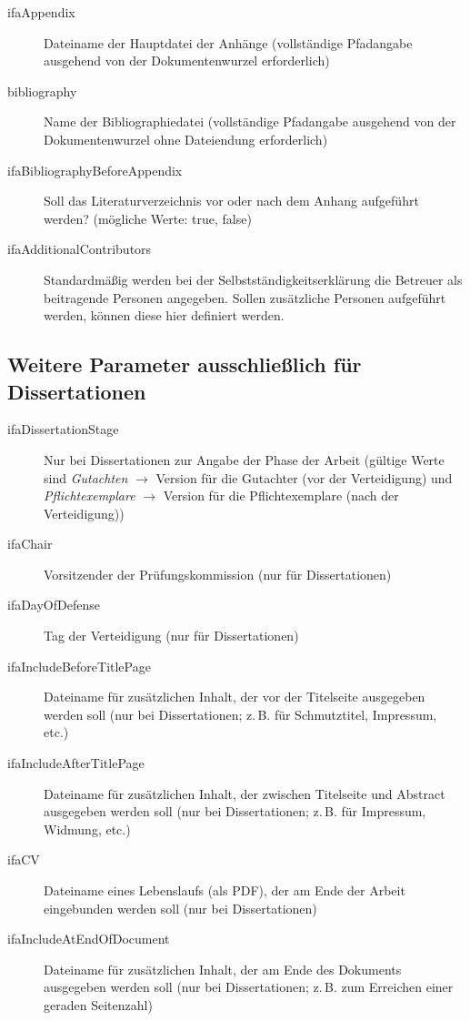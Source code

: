 \begin{description}
  \item[ifaAppendix] Dateiname der Hauptdatei der Anhänge (vollständige Pfadangabe ausgehend von der Dokumentenwurzel erforderlich)
  \item[bibliography] Name der Bibliographiedatei (vollständige Pfadangabe
  ausgehend von der Dokumentenwurzel ohne Dateiendung erforderlich)
  \item[ifaBibliographyBeforeAppendix] Soll das Literaturverzeichnis vor oder nach dem Anhang aufgeführt werden? (mögliche Werte: true, false)
  \item[ifaAdditionalContributors] Standardmäßig werden bei der
  Selbstständigkeitserklärung die Betreuer als beitragende Personen angegeben.
  Sollen zusätzliche Personen aufgeführt werden, können diese hier definiert werden.
\end{description}


\subsection{Weitere Parameter ausschließlich für Dissertationen}

\begin{description}
  \item[ifaDissertationStage] Nur bei Dissertationen zur Angabe der Phase der Arbeit (gültige Werte sind \emph{Gutachten} $\rightarrow$ Version für die Gutachter (vor der Verteidigung) und \emph{Pflichtexemplare} $\rightarrow$ Version für die Pflichtexemplare (nach der Verteidigung))
  \item[ifaChair] Vorsitzender der Prüfungskommission (nur für Dissertationen)
  \item[ifaDayOfDefense] Tag der Verteidigung (nur für Dissertationen)
  \item[ifaIncludeBeforeTitlePage] Dateiname für zusätzlichen Inhalt, der vor der Titelseite ausgegeben werden soll (nur bei Dissertationen; z.\,B. für Schmutztitel, Impressum, etc.)
  \item[ifaIncludeAfterTitlePage] Dateiname für zusätzlichen Inhalt, der zwischen Titelseite und Abstract ausgegeben werden soll (nur bei Dissertationen; z.\,B. für Impressum, Widmung, etc.)
  \item[ifaCV] Dateiname eines Lebenslaufs (als PDF), der am Ende der Arbeit eingebunden werden soll (nur bei Dissertationen)
  \item[ifaIncludeAtEndOfDocument] Dateiname für zusätzlichen Inhalt, der am Ende des Dokuments ausgegeben werden soll (nur bei Dissertationen; z.\,B. zum Erreichen einer geraden Seitenzahl)
\end{description}

